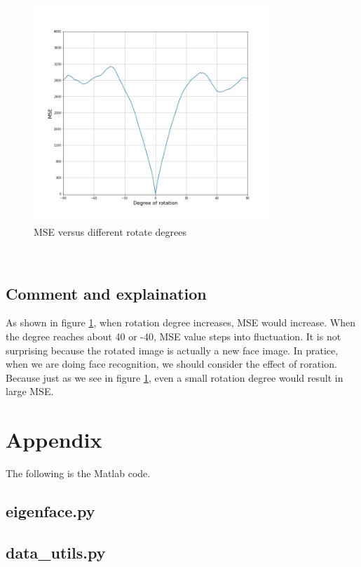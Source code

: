\documentclass{article}
\begin{document}
\begin{figure}[h]
  \centering
  \includegraphics[width=0.8\textwidth]{../image/mse_rotate.jpg}
  \caption{MSE versus different rotate degrees}
  \label{fig:fig7}
\end{figure}
\\

\subsection{Comment and explaination}
As shown in figure \ref{fig:fig7}, when rotation degree increases, MSE would increase. When the degree reaches
about 40 or -40, MSE value steps into fluctuation. It is not surprising because the rotated image is actually a
new face image. In pratice, when we are doing face recognition, we should consider the effect of roration.
Because just as we see in figure \ref{fig:fig7}, even a small rotation degree would result in large MSE.

  


\section*{Appendix}

The following is the Matlab code.

\subsection*{eigenface.py}
\lstset{style=mystyle}


\subsection*{data\_utils.py}
\lstset{style=mystyle}

\end{document}
